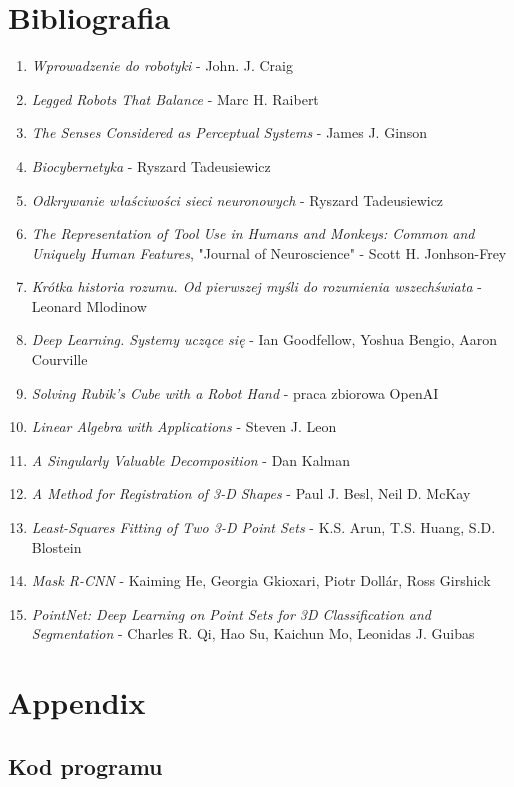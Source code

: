 \documentclass{article}
\begin{document}
\section*{\LARGE{Bibliografia}} 
\begin{enumerate}
\item \emph{Wprowadzenie do robotyki} - John. J. Craig
\item \emph{Legged Robots That Balance} - Marc H. Raibert
\item \emph{The Senses Considered as Perceptual Systems} - James J. Ginson
\item \emph{Biocybernetyka} - Ryszard Tadeusiewicz
\item \emph{Odkrywanie właściwości sieci neuronowych} - Ryszard Tadeusiewicz
\item \emph{The Representation of Tool Use in Humans and Monkeys: Common and Uniquely Human Features}, "Journal of Neuroscience" - Scott H. Jonhson-Frey
\item \emph{Krótka historia rozumu. Od pierwszej myśli do rozumienia wszechświata} - Leonard Mlodinow
\item \emph{Deep Learning. Systemy uczące się} - Ian Goodfellow, Yoshua Bengio, Aaron Courville
\item \emph{Solving Rubik's Cube with a Robot Hand} - praca zbiorowa OpenAI
\item \emph{Linear Algebra with Applications} - Steven J. Leon
\item \emph{A Singularly Valuable Decomposition} - Dan Kalman
\item \emph{A Method for Registration of 3-D Shapes} - Paul J. Besl, Neil D. McKay
\item \emph{Least-Squares Fitting of Two 3-D Point Sets} - K.S. Arun, T.S. Huang, S.D. Blostein
\item \emph{Mask R-CNN} - Kaiming He, Georgia Gkioxari, Piotr Dollár, Ross Girshick
\item \emph{PointNet: Deep Learning on Point Sets for 3D Classification and Segmentation} - Charles R. Qi, Hao Su, Kaichun Mo, Leonidas J. Guibas
\end{enumerate}

\newpage
\section*{\LARGE{Appendix}}
\subsection*{\Large{Kod programu}}

\end{document}
